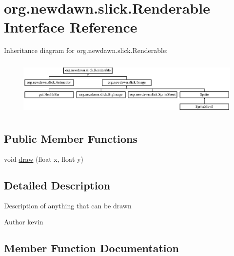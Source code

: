 \hypertarget{interfaceorg_1_1newdawn_1_1slick_1_1_renderable}{}\section{org.\+newdawn.\+slick.\+Renderable Interface Reference}
\label{interfaceorg_1_1newdawn_1_1slick_1_1_renderable}
Inheritance diagram for org.\+newdawn.\+slick.\+Renderable\+:\begin{figure}[H]
\begin{center}
\leavevmode
\includegraphics[height=2.886598cm]{interfaceorg_1_1newdawn_1_1slick_1_1_renderable}
\end{center}
\end{figure}
\subsection*{Public Member Functions}
\begin{DoxyCompactItemize}
\item 
void \mbox{\hyperlink{interfaceorg_1_1newdawn_1_1slick_1_1_renderable_a26cbac11f8309c268035688dfbf7203d}{draw}} (float x, float y)
\end{DoxyCompactItemize}


\subsection{Detailed Description}
Description of anything that can be drawn

\begin{DoxyAuthor}{Author}
kevin 
\end{DoxyAuthor}


\subsection{Member Function Documentation}
\mbox{\label{interfaceorg_1_1newdawn_1_1slick_1_1_renderable_a26cbac11f8309c268035688dfbf7203d}} 
